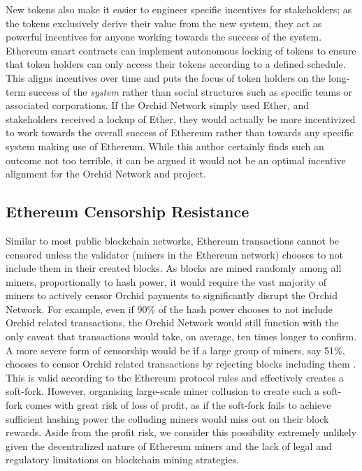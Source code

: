 New tokens also make it easier to engineer specific incentives for stakeholders; as the tokens exclusively derive their value from the new system, they act as powerful incentives for anyone working towards the success of the system. Ethereum smart contracts can implement autonomous locking of tokens to ensure that token holders can only access their tokens according to a defined schedule. This aligns incentives over time and puts the focus of token holders on the long-term success of the \emph{system} rather than social structures such as specific teams or associated corporations. If the Orchid Network simply used Ether, and stakeholders received a lockup of Ether, they would actually be more incentivized to work towards the overall success of Ethereum rather than towards any specific system making use of Ethereum. While this author certainly finds such an outcome not too terrible, it can be argued it would not be an optimal incentive alignment for the Orchid Network and project.

\subsection{Ethereum Censorship Resistance}

Similar to most public blockchain networks, Ethereum transactions cannot be censored unless the validator (miners in the Ethereum network) chooses to not include them in their created blocks. As blocks are mined randomly among all miners, proportionally to hash power, it would require the vast majority of miners to actively censor Orchid payments to significantly disrupt the Orchid Network. For example, even if 90\% of the hash power chooses to not include Orchid related transactions, the Orchid Network would still function with the only caveat that transactions would take, on average, ten times longer to confirm. A more severe form of censorship would be if a large group of miners, say 51\%, chooses to censor Orchid related transactions by rejecting blocks including them \cite{BitcoinEconomics}. This is valid according to the Ethereum protocol rules and effectively creates a soft-fork. However, organising large-scale miner collusion to create such a soft-fork comes with great risk of loss of profit, as if the soft-fork fails to achieve sufficient hashing power the colluding miners would miss out on their block rewards. Aside from the profit risk, we consider this possibility extremely unlikely given the decentralized nature of Ethereum miners and the lack of legal and regulatory limitations on blockchain mining strategies.

